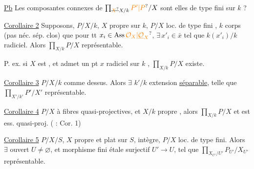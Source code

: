 \uline{Pb} Les composantes connexes de $\prod_{\deleted{\unsure{X}}X/k}\unsure{P'|P}/X$ sont elles de type fini sur $k$ ?

\uline{Corollaire 2} Supposons,  $P/X/k$, $X$ propre sur $k$, $P/X$ loc. de type fini , $k$ corps (pas néc. sép. clos) que  pour tt $x_i\in\operatorname{Ass}\unsure{\mathcal O_X|\underline{\mathcal O}_X}$, $\exists\,x'_i\in\bar x$ tel que $k(x'_i)/k$ radiciel.  Alors $\prod_{X/k}P/X$ représentable.




P. ex. si $X$  est ,  et admet un pt $x$ radiciel sur $k$ , $\prod_{X/k}P/X$ existe.

\uline{Corollaire 3} $P/X/k$ comme dessus. Alors $\exists$ $k'/k$ extension  \uline{séparable}, telle que $\prod_{X'/k'}P'/X'$ représentable.



\uline{Corollaire 4}  $P/X$ à fibres quasi-projectives, et $X/k$ propre , alors $\prod_{X/k}P/X$  et est ess. quasi-proj. ( : Cor. 1)

\uline{Corollaire 5} $P/X/S$, $X$ propre et plat sur $S$,  intègre, $P/X$ loc. de type fini. Alors $\exists$  ouvert $U\ne\varnothing$, et morphisme fini étale surjectif $U'\to U$, tel que $\prod_{X_{U'}/U'}P_{U'}/X_{U'}$ représentable.



